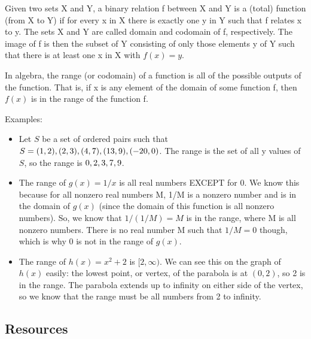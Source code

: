 Given two sets X and Y, a binary relation f between X and Y is a (total) function (from X
to Y) if for every x in X there is exactly one y in Y such that f relates x to y. The sets
X and Y are called domain and codomain of f, respectively. The image of f is then the
subset of Y consisting of only those elements y of Y such that there is at least one x in
X with $f(x) = y$.



In algebra, the range (or codomain) of a function is all of the possible outputs of the
function. That is, if x is any element of the domain of some function f, then $f(x)$ is in
the range of the function f.



Examples:



\begin{itemize}
    \item Let $S$ be a set of ordered pairs such that $S = \\{(1,2), (2,3), (4, 7), (13, 9), (-20, 0)\\}$. The range is the set of all y values of $S$, so the range is $\\{0, 2, 3, 7, 9\\}$.
    \item The range of $g(x) = 1/x$ is all real numbers EXCEPT for 0. We know this because for all nonzero real numbers M, 1/M is a nonzero number and is in the domain of $g(x)$ (since the domain of this function is all nonzero numbers). So, we know that $1/(1/M) = M$ is in the range, where M is all nonzero numbers. There is no real number M such that $1/M = 0$ though, which is why 0 is not in the range of $g(x)$.
    \item The range of $h(x) = x^2 + 2$ is $[2,\infty)$. We can see this on the graph of $h(x)$ easily: the lowest point, or vertex, of the parabola is at $(0, 2)$, so 2 is in the range. The parabola extends up to infinity on either side of the vertex, so we know that the range must be all numbers from 2 to infinity.
\end{itemize}


\subsection{Resources}
\label{sss:reso-55b5}





